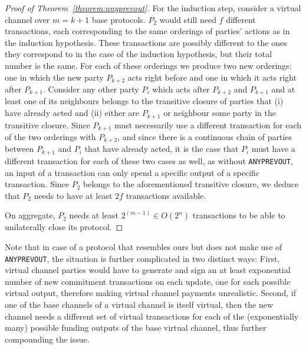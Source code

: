 \begin{proof}[Proof of Theorem~\ref{theorem:anyprevout}]
    For the induction step, consider a virtual channel over $m = k + 1$ base
    protocols. $P_2$ would still need $f$ different transactions, each
    corresponding to the same orderings of parties' actions as in the induction
    hypothesis. These transactions are possibly different to the ones they
    correspond to in the case of the induction hypothesis, but their total
    number is the same. For each of these orderings we produce two new
    orderings: one in which the new party $P_{k+2}$ acts right before and one in
    which it acts right after $P_{k+1}$. Consider any other party $P_i$ which
    acts after $P_{k+2}$ and $P_{k+1}$ and at least one of its neighbours
    belongs to the transitive closure of parties that (i) have already acted and
    (ii) either are $P_{k+1}$ or neighbour some party in the transitive closure.
    Since $P_{k+1}$ must necessarily use a different transaction for each of the
    two orderings with $P_{k+2}$, and since there is a continuous chain of
    parties between $P_{k+1}$ and $P_i$ that have already acted, it is the case
    that $P_i$ must have a different transaction for each of these two cases as
    well, as without \texttt{ANYPREVOUT}, an input of a transaction can only
    spend a specific output of a specific transaction. Since $P_2$ belongs to
    the aforementioned transitive closure, we deduce that $P_2$ needs to have at
    least $2f$ transactions available.

    On aggregate, $P_2$ needs at least $2^{(m-1)} \in O(2^n)$ transactions to be
    able to unilaterally close its protocol.
  \end{proof}

  Note that in case of a protocol that resembles ours but does not make use of
  \texttt{ANYPREVOUT}, the situation is further complicated in two distinct
  ways: First, virtual channel parties would have to generate and sign an at
  least exponential number of new commitment transactions on each update, one
  for each possible virtual output, therefore making virtual channel payments
  unrealistic. Second, if one of the base channels of a virtual channel is
  itself virtual, then the new channel needs a different set of virtual
  transactions for each of the (exponentially many) possible funding outputs of
  the base virtual channel, thus further compounding the issue.

